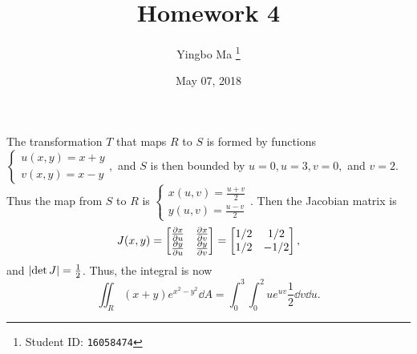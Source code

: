 \documentclass[8pt]{article}
\author{Yingbo Ma \thanks{Student ID: \tt{16058474}}}
\title{\vspace{-1.cm}Homework 4}
\date{May 07, 2018}
\begin{document}
\maketitle

\begin{Answer}[number=21]
  The transformation $T$ that maps $R$ to $S$ is formed by functions
  \(
    \begin{cases}
      u(x,y) = x+y \\
      v(x,y) = x-y
    \end{cases},
  \)
  and $S$ is then bounded by $u=0, u=3, v=0,$ and $v=2$. Thus the map from $S$
  to $R$ is
  \(
    \begin{cases}
      x(u,v) = \frac{u+v}{2} \\
      y(u,v) = \frac{u-v}{2}
    \end{cases}.
  \)
  Then the Jacobian matrix is
  \[
    J(x,y)={\begin{bmatrix}
      \pdv{x}{u}&\pdv{x}{v}\\
      \pdv{y}{u}&\pdv{y}{v}
    \end{bmatrix}}=
    \begin{bmatrix}1/2&1/2\\1/2&-1/2\end{bmatrix},
  \]
  and $\abs{\det J} = \frac{1}{2}$. Thus, the integral is now
      \[
    \iint_R (x+y)e^{x^2-y^2}\dd{A} = \int_0^3\int_0^2
    ue^{uv}\frac{1}{2}\dd{v}\dd{u}.
  \]
\end{Answer}
\end{document}
